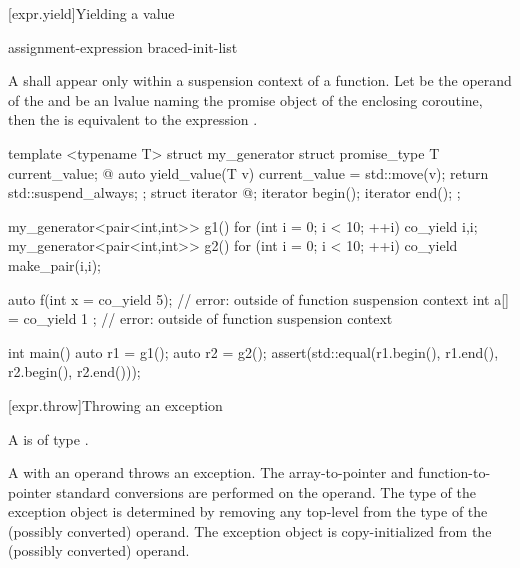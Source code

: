 [expr.yield]{Yielding a value}%
%
%

\begin{bnf}
  \br
   assignment-expression\br
   braced-init-list
\end{bnf}

\pnum
A  shall appear only within a suspension context
of a function.
Let  be the operand of the  and
 be an lvalue naming the promise object of the enclosing
coroutine, then the 
is equivalent to the expression
.

\begin{example}
\begin{codeblock}
template <typename T>
struct my_generator {
  struct promise_type {
    T current_value;
    @\commentellip@
    auto yield_value(T v) {
      current_value = std::move(v);
      return std::suspend_always{};
    }
  };
  struct iterator { @\commentellip@ };
  iterator begin();
  iterator end();
};

my_generator<pair<int,int>> g1() {
  for (int i = 0; i < 10; ++i) co_yield {i,i};
}
my_generator<pair<int,int>> g2() {
  for (int i = 0; i < 10; ++i) co_yield make_pair(i,i);
}

auto f(int x = co_yield 5);     // error:  outside of function suspension context
int a[] = { co_yield 1 };       // error:  outside of function suspension context

int main() {
  auto r1 = g1();
  auto r2 = g2();
  assert(std::equal(r1.begin(), r1.end(), r2.begin(), r2.end()));
}
\end{codeblock}
\end{example}

[expr.throw]{Throwing an exception}%
%
%
%
%
\begin{bnf}
\br
      
\end{bnf}

\pnum
A  is of type .

\pnum
A  with an operand throws an
exception.
The array-to-pointer and function-to-pointer
standard conversions are performed on the operand.
The type of the exception object is determined by removing
any top-level  from the type of the
(possibly converted) operand.
The exception object is copy-initialized
from the (possibly converted) operand.

